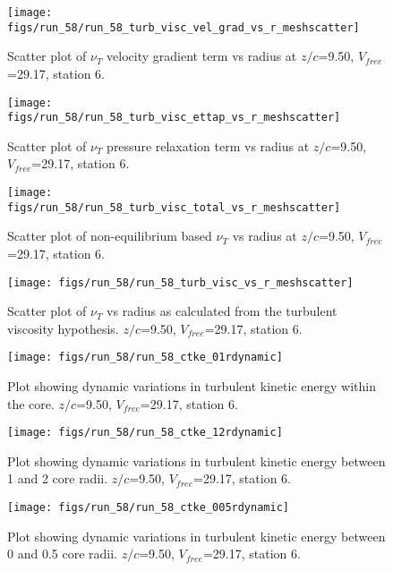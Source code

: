 \begin{figure}[H]
\centering
\texttt{[image: figs/run\_58/run\_58\_turb\_visc\_vel\_grad\_vs\_r\_meshscatter]}
\caption{Scatter plot of $\nu_T$ velocity gradient term vs radius at $z/c$=9.50, $V_{free}$=29.17, station 6.}
\end{figure}


\begin{figure}[H]
\centering
\texttt{[image: figs/run\_58/run\_58\_turb\_visc\_ettap\_vs\_r\_meshscatter]}
\caption{Scatter plot of $\nu_T$ pressure relaxation term vs radius at $z/c$=9.50, $V_{free}$=29.17, station 6.}
\end{figure}


\begin{figure}[H]
\centering
\texttt{[image: figs/run\_58/run\_58\_turb\_visc\_total\_vs\_r\_meshscatter]}
\caption{Scatter plot of non-equilibrium based $\nu_T$ vs radius at $z/c$=9.50, $V_{free}$=29.17, station 6.}
\end{figure}


\begin{figure}[H]
\centering
\texttt{[image: figs/run\_58/run\_58\_turb\_visc\_vs\_r\_meshscatter]}
\caption{Scatter plot of $\nu_T$ vs radius as calculated from the turbulent viscosity hypothesis. $z/c$=9.50, $V_{free}$=29.17, station 6.}
\end{figure}


\begin{figure}[H]
\centering
\texttt{[image: figs/run\_58/run\_58\_ctke\_01rdynamic]}
\caption{Plot showing dynamic variations in turbulent kinetic energy within the core. $z/c$=9.50, $V_{free}$=29.17, station 6.}
\end{figure}


\begin{figure}[H]
\centering
\texttt{[image: figs/run\_58/run\_58\_ctke\_12rdynamic]}
\caption{Plot showing dynamic variations in turbulent kinetic energy between 1 and 2 core radii. $z/c$=9.50, $V_{free}$=29.17, station 6.}
\end{figure}


\begin{figure}[H]
\centering
\texttt{[image: figs/run\_58/run\_58\_ctke\_005rdynamic]}
\caption{Plot showing dynamic variations in turbulent kinetic energy between 0 and 0.5 core radii. $z/c$=9.50, $V_{free}$=29.17, station 6.}
\end{figure}


